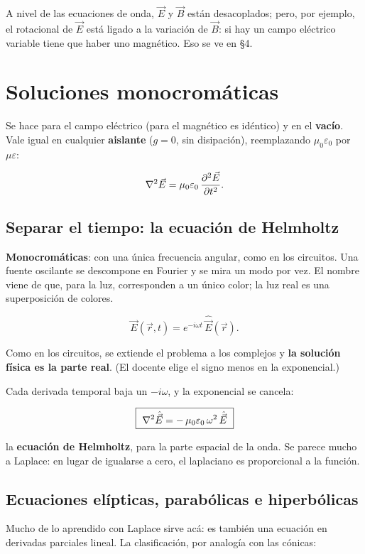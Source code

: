 \documentclass[12pt,a4paper]{article}
\begin{document}
A nivel de las ecuaciones de onda, $\vec E$ y $\vec B$ están desacoplados;
pero, por ejemplo, el rotacional de $\vec E$ está ligado a la variación de
$\vec B$: si hay un campo eléctrico variable tiene que haber uno magnético. Eso
se ve en §4.

\section{Soluciones monocromáticas}

Se hace para el campo eléctrico (para el magnético es idéntico) y en el
\textbf{vacío}. Vale igual en cualquier \textbf{aislante} ($g = 0$, sin disipación),
reemplazando $\mu_0\varepsilon_0$ por $\mu\varepsilon$:

\[
\laplacian\vec E = \mu_0\varepsilon_0\,\pdv[2]{\vec E}{t}.
\]

\subsection{Separar el tiempo: la ecuación de Helmholtz}

\textbf{Monocromáticas}: con una única frecuencia angular, como en los circuitos.
Una fuente oscilante se descompone en Fourier y se mira un modo por vez. El
nombre viene de que, para la luz, corresponden a un único color; la luz real es
una superposición de colores.

\[
\vec E(\vec r, t) = e^{-i\omega t}\,\hat{\vec E}(\vec r).
\]

Como en los circuitos, se extiende el problema a los complejos y \textbf{la solución
física es la parte real}. (El docente elige el signo menos en la exponencial.)

Cada derivada temporal baja un $-i\omega$, y la exponencial se cancela:

\begin{keybox}
\[
\boxed{\ \laplacian\hat{\vec E} = -\,\mu_0\varepsilon_0\,\omega^2\,\hat{\vec E}\ }
\]
\end{keybox}
la \textbf{ecuación de Helmholtz}, para la parte espacial de la onda. Se parece
mucho a Laplace: en lugar de igualarse a cero, el laplaciano es proporcional a
la función.

\subsection{Ecuaciones elípticas, parabólicas e hiperbólicas}

Mucho de lo aprendido con Laplace sirve acá: es también una ecuación en
derivadas parciales lineal. La clasificación, por analogía con las cónicas:
\end{document}
